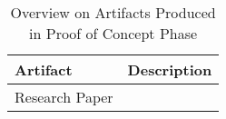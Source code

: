 
\begin{table}[H]
  \label{tbl:phase-2-artifacts}
  \caption{Overview on Artifacts Produced in Proof of Concept Phase}

  \begin{tabular}{|l|l|}
    \hline
    \bf{Artifact}       & \bf{Description} \\ \hline
    Research Paper      &                  \\ \hline
  \end{tabular}

\end{table}
